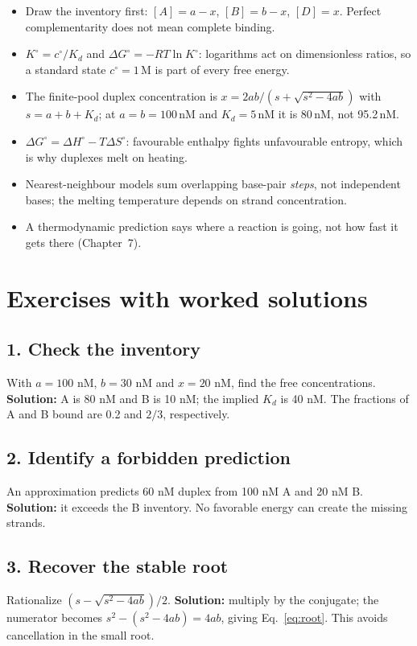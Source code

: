 \begin{KeyIdeas}
\begin{itemize}\setlength{\itemsep}{2pt}
\item Draw the inventory first: $[A]=a-x$, $[B]=b-x$, $[D]=x$. Perfect
complementarity does not mean complete binding.
\item $K^\circ=c^\circ/K_d$ and $\Delta G^\circ=-RT\ln K^\circ$: logarithms act on
dimensionless ratios, so a standard state $c^\circ=1$\,M is part of every
free energy.
\item The finite-pool duplex concentration is
$x=2ab/(s+\sqrt{s^2-4ab})$ with $s=a+b+K_d$; at $a=b=100$\,nM and $K_d=5$\,nM it is
80\,nM, not 95.2\,nM.
\item $\Delta G^\circ=\Delta H^\circ-T\Delta S^\circ$: favourable enthalpy fights
unfavourable entropy, which is why duplexes melt on heating.
\item Nearest-neighbour models sum overlapping base-pair \emph{steps}, not
independent bases; the melting temperature depends on strand concentration.
\item A thermodynamic prediction says where a reaction is going, not how fast it
gets there (Chapter~7).
\end{itemize}
\end{KeyIdeas}

\section{Exercises with worked solutions}

\subsection*{1. Check the inventory}
With $a=100$ nM, $b=30$ nM and $x=20$ nM, find the free concentrations.
\textbf{Solution:} A is 80 nM and B is 10 nM; the implied $K_d$ is 40 nM.
The fractions of A and B bound are 0.2 and $2/3$, respectively.

\subsection*{2. Identify a forbidden prediction}
An approximation predicts 60 nM duplex from 100 nM A and 20 nM B.
\textbf{Solution:} it exceeds the B inventory. No favorable energy can
create the missing strands.

\subsection*{3. Recover the stable root}
Rationalize $(s-\sqrt{s^2-4ab})/2$.
\textbf{Solution:} multiply by the conjugate; the numerator becomes
$s^2-(s^2-4ab)=4ab$, giving Eq.~\ref{eq:root}. This avoids cancellation
in the small root.

